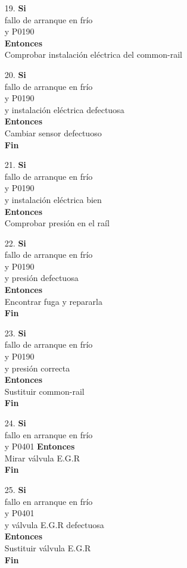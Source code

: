 \documentclass[a4paper,12pt]{article}
\newcommand\tab[1][1cm]{\hspace*{#1}}
\begin{document}
\begin{itemize}
\item[19.]\textbf{Si}\\ \tab fallo de arranque en frío\\ \tab y P0190\\ \textbf{Entonces}\\ \tab Comprobar instalación eléctrica del common-rail
\item[20.]\textbf{Si}\\ \tab fallo de arranque en frío\\ \tab y P0190\\ \tab y instalación eléctrica defectuosa \\ \textbf{Entonces}\\ \tab Cambiar sensor defectuoso\\ \tab \textbf{Fin}
\item[21.]\textbf{Si}\\ \tab fallo de arranque en frío\\ \tab y P0190\\ \tab y instalación eléctrica bien \\ \textbf{Entonces}\\ \tab Comprobar presión en el raíl
\item[22.]\textbf{Si}\\ \tab fallo de arranque en frío\\ \tab y P0190\\ \tab y presión defectuosa \\ \textbf{Entonces}\\ \tab Encontrar fuga y repararla \\ \tab \textbf{Fin}
\item[23.]\textbf{Si}\\ \tab fallo de arranque en frío\\ \tab y P0190\\ \tab y presión correcta \\ \textbf{Entonces}\\ \tab Sustituir common-rail \\ \tab \textbf{Fin}
\item[24.]\textbf{Si}\\ \tab fallo en arranque en frío\\ \tab y P0401 \textbf{Entonces}\\ \tab Mirar válvula E.G.R\\ \tab \textbf{Fin}
\item[25.]\textbf{Si}\\ \tab fallo en arranque en frío\\ \tab y P0401\\ \tab y válvula E.G.R defectuosa \\ \textbf{Entonces}\\ \tab Sustituir válvula E.G.R\\ \tab \textbf{Fin}

\end{itemize}
\end{document}
